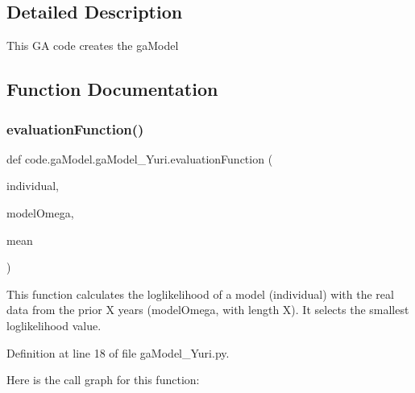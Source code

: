 \subsection{Detailed Description}
\begin{DoxyVerb}This GA code creates the gaModel \end{DoxyVerb}
 

\subsection{Function Documentation}
\mbox{\label{namespacecode_1_1ga_model_1_1ga_model___yuri_a9c1c78cf1b81c95dc2e477391409be13}} 
\subsubsection{\texorpdfstring{evaluation\+Function()}{evaluationFunction()}}
{\footnotesize\ttfamily def code.\+ga\+Model.\+ga\+Model\+\_\+\+Yuri.\+evaluation\+Function (\begin{DoxyParamCaption}\item[{}]{individual,  }\item[{}]{model\+Omega,  }\item[{}]{mean }\end{DoxyParamCaption})}

\begin{DoxyVerb}This function calculates the loglikelihood of a model (individual) with 
the real data from the prior X years (modelOmega, with length X).
It selects the smallest loglikelihood value.
\end{DoxyVerb}
 

Definition at line 18 of file ga\+Model\+\_\+\+Yuri.\+py.

Here is the call graph for this function\+:
\mbox{\label{namespacecode_1_1ga_model_1_1ga_model___yuri_a4863c0a39df647a724c38d9a9a022c0b}} 
